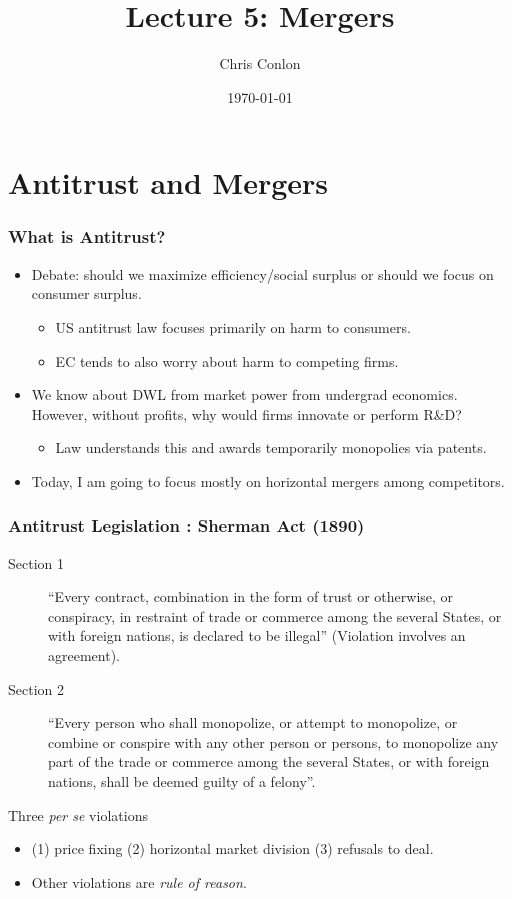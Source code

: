 \documentclass[xcolor=pdftex,dvipsnames,table,mathserif]{beamer}
\begin{document}
\title{Lecture 5: Mergers}
\author{Chris Conlon}
\date{\today}

\frame{\titlepage}

\section{Antitrust and Mergers}

\begin{frame}
\frametitle{What is Antitrust?}
 \begin{itemize}
\item Debate: should we maximize \alert{efficiency/social surplus} or should we focus on \alert{consumer surplus}.
\begin{itemize}
\item US antitrust law focuses primarily on harm to consumers.
\item EC tends to also worry about harm to competing firms.
 \end{itemize}
 \item We know about DWL from market power from undergrad economics. However, without profits, why would firms innovate or perform R\&D?
 \begin{itemize}
\item Law understands this and awards temporarily monopolies via patents.
 \end{itemize}
\item Today, I am going to focus mostly on \alert{horizontal mergers} among competitors.
 \end{itemize}
\end{frame}

\begin{frame}
\frametitle{Antitrust Legislation : Sherman Act (1890)}
 \begin{description}
\item [Section 1]``Every contract, combination in the form of trust or otherwise, or conspiracy, in restraint of trade or commerce among the several States, or with foreign nations, is declared to be illegal'' (Violation involves an \alert{agreement}).
\item [Section 2] ``Every person who shall monopolize, or attempt to monopolize, or combine or conspire with any other person or persons, to monopolize any part of the trade or commerce among the several States, or with foreign nations, shall be deemed guilty of a felony''.
 \end{description}
 Three \textit{per se} violations
 \begin{itemize}
 \item (1) price fixing (2) horizontal market division (3) refusals to deal.
 \item Other violations are \textit{rule of reason}.
 \end{itemize}
 
\end{frame}
\end{document}
